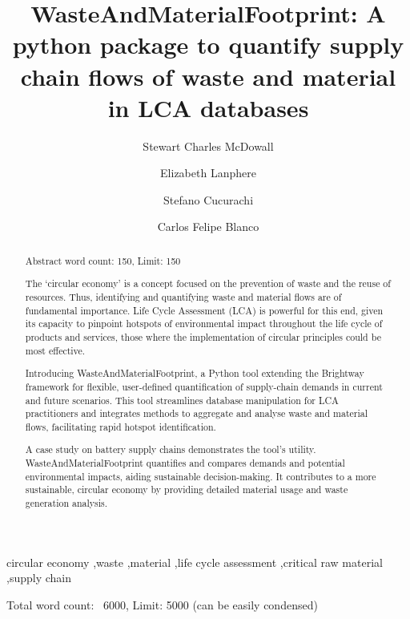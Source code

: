 \documentclass[review,3p,authoryear]{elsarticle}
\newcommand{\cbox}[1]{
    \begin{tcolorbox}[hbox, colback=red!5!white, colframe=red!65!black, boxrule=0.25pt, boxsep=2pt, left=2pt, right=2pt, top=1pt, bottom=1pt]
        \small\sffamily #1
    \end{tcolorbox}
}
\begin{document}
\begin{frontmatter}

    \title{WasteAndMaterialFootprint: A python package to quantify supply chain flows of waste and material in LCA databases}
    \author[1]{Stewart Charles McDowall}
    \author[1]{Elizabeth Lanphere}
    \author[1]{Stefano Cucurachi}
    \author[1]{Carlos Felipe Blanco}



    \begin{abstract}
        \cbox{Abstract word count: 150, Limit: 150}
        
        The `circular economy' is a concept focused on the prevention of waste and the reuse of resources. Thus, identifying and quantifying waste and material flows are of fundamental importance. Life Cycle Assessment (LCA) is powerful for this end, given its capacity to pinpoint hotspots of environmental impact throughout the life cycle of products and services, those where the implementation of circular principles could be most effective.

        Introducing WasteAndMaterialFootprint, a Python tool extending the Brightway framework for flexible, user-defined quantification of supply-chain demands in current and future scenarios. This tool streamlines database manipulation for LCA practitioners and integrates methods to aggregate and analyse waste and material flows, facilitating rapid hotspot identification.

        A case study on battery supply chains demonstrates the tool's utility. WasteAndMaterialFootprint quantifies and compares demands and potential environmental impacts, aiding sustainable decision-making. It contributes to a more sustainable, circular economy by providing detailed material usage and waste generation analysis.

    \end{abstract}


    \begin{keyword}
        circular economy \sep waste \sep material \sep life cycle assessment \sep critical raw material \sep supply chain
    \end{keyword}

\end{frontmatter}
\cbox{Total word count: ~6000, Limit: 5000 (can be easily condensed)}
\end{document}
